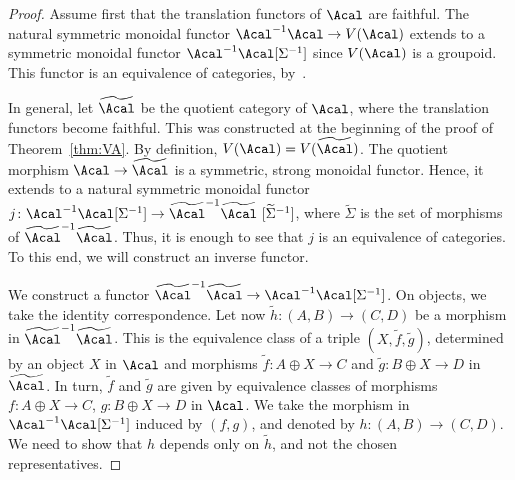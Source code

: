 \begin{proof}
Assume first that the translation functors of $\Acal$ are faithful. The natural symmetric monoidal functor $\Acal^{-1}\Acal\to V(\Acal)$ extends to a symmetric monoidal functor $\Acal^{-1}\Acal[\Sigma^{-1}]$ since $V(\Acal)$ is a groupoid. This functor is an equivalence of categories, by~\cite[III, Cor.\,1.2]{JG}.

In general, let $\widetilde{\Acal}$ be the quotient category of $\Acal$, where the translation functors become faithful. This was constructed at the beginning of the proof of Theorem~\ref{thm:VA}. By definition, $V(\Acal)=V(\widetilde{\Acal} )$. The quotient morphism $\Acal\to\widetilde{\Acal}$ is a symmetric, strong monoidal functor. Hence, it extends to a natural symmetric monoidal functor $j\colon \Acal^{-1}\Acal[\Sigma^{-1}]\to\widetilde{\Acal}^{-1}\widetilde{\Acal}\ [\widetilde{\Sigma}^{-1}]$, where $\widetilde{\Sigma}$ is the set of morphisms of $\widetilde{\Acal}^{-1}\widetilde{\Acal}$. Thus, it is enough to see that $j$ is an equivalence of categories. To this end, we will construct an inverse functor.

We construct a functor $\widetilde{\Acal}^{-1}\widetilde{\Acal}\to\Acal^{-1}\Acal[\Sigma^{-1}]$. On objects, we take the identity correspondence. Let now $\widetilde{h}\colon (A,B)\to (C,D)$ be a morphism in $\widetilde{\Acal}^{-1}\widetilde{\Acal}$. This is the equivalence class of a triple $(X,\widetilde{f},\widetilde{g})$, determined by an object $X$ in $\Acal$ and morphisms $\widetilde{f}\colon A\oplus X\to C$ and $\widetilde{g}\colon B\oplus X\to D$ in $\widetilde{\Acal}$. In turn, $\widetilde{f}$ and $\widetilde{g}$ are given by equivalence classes of morphisms $f\colon A\oplus X\to C$, $g\colon B\oplus X\to D$ in $\Acal$. We take the morphism in $\Acal^{-1}\Acal[\Sigma^{-1}]$ induced by $(f,g)$, and denoted by $h\colon (A,B)\to (C,D)$. We need to show that $h$ depends only on $\widetilde{h}$, and not the chosen representatives.


\end{proof}
